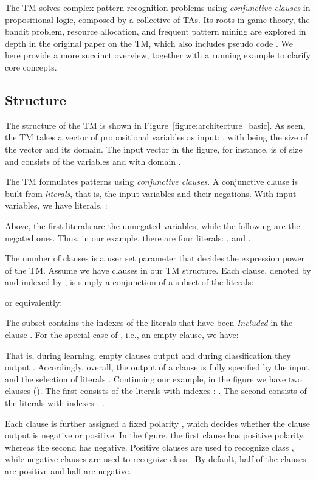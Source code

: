 \documentclass{article}
\begin{document}
The TM solves complex pattern recognition problems using \emph{conjunctive clauses} in propositional logic, composed by a collective of TAs. Its roots in game theory, the bandit problem, resource allocation, and frequent pattern mining are explored in depth in the original paper on the TM, which also includes pseudo code \cite{granmo2018tsetlin}. We here provide a more succinct overview, together with a running example to clarify core concepts.

\subsection{Structure}
The structure of the TM is shown in Figure~\ref{figure:architecture_basic}. As seen, the TM takes a vector  of  propositional variables as input: , with  being the size of the vector and  its domain. The input vector in the figure, for instance, is of size  and consists of the variables  and  with domain . 

The TM formulates patterns using \emph{conjunctive clauses}. A conjunctive clause is built from  \emph{literals}, that is, the input variables and their negations. With  input variables, we have  literals, :

Above, the first  literals are the unnegated variables, while the  following are the negated ones. Thus, in our example, there are four literals: , and . 

The number of clauses is a user set parameter that decides the expression power of the TM. Assume we have  clauses in our TM structure. Each clause, denoted by  and indexed by , is simply a conjunction of a subset  of the literals:

or equivalently:

The subset  contains the indexes of the literals that have been \emph{Included} in the clause . For the special case of , i.e., an empty clause, we have:

That is, during learning, empty clauses output  and during classification they output .
Accordingly, overall, the output  of a clause is fully specified by the input  and the selection of literals . Continuing our example, in the figure we have two clauses (). The first consists of the literals with indexes : . The second consists of the literals with indexes : .

Each clause is further assigned a fixed polarity , which decides whether the clause output is negative or positive. In the figure, the first clause has positive polarity, whereas the second has negative. Positive clauses are used to recognize class , while negative clauses are used to recognize class . By default, half of the clauses are positive and half are negative. 
\end{document}
